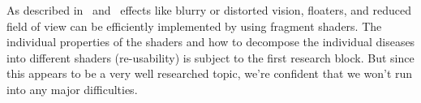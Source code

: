 \documentclass{acm_proc_article-sp}
\begin{document}
As described in \cite{gazedisplays} and \cite{eyediseasesim} effects like
blurry or distorted vision, floaters, and reduced field of view can be
efficiently implemented by using fragment shaders. The individual properties
of the shaders and how to decompose the individual diseases into different
shaders (re-usability) is subject to the first research block. But since this
appears to be a very well researched topic, we're confident that we won't run
into any major difficulties.

%
%
%
%
%
%
%
%
\end{document}
